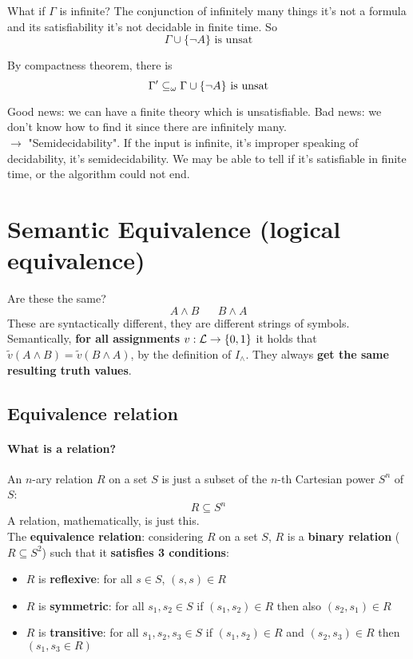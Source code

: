 	What if $\Gamma$ is infinite? The conjunction of infinitely many things it's not a formula and its satisfiability it's not decidable in finite time. So
	$$ \Gamma  \cup \{\neg A\} \text{ is unsat}$$

	By compactness theorem, there is
	$$ \Gamma' \subseteq_\omega \Gamma \cup \{\neg A\} \text{ is unsat} $$

	Good news: we can have a finite theory which is unsatisfiable. Bad news: we don't know how to find it since there are infinitely many.\\
	$\rightarrow$ "Semidecidability". If the input is infinite, it's improper speaking of decidability, it's semidecidability. We may be able to tell if it's satisfiable in finite time, or the algorithm could not end.\\

	\newpage

	\section{Semantic Equivalence (logical equivalence)}

	Are these the same?
	$$ A \wedge B \;\;\;\;\;\; B \wedge A $$
	These are syntactically different, they are different strings of symbols.\\

	Semantically, \textbf{for all assignments} $v: \mathcal{L} \rightarrow \{0,1\}$ it holds that $\tilde{v} (A \wedge B) = \tilde{v} (B \wedge A)$, by the definition of $I_\wedge$. They always \textbf{get the same resulting truth values}.\\

	\subsection{Equivalence relation}

	\paragraph{What is a relation?} An $n$-ary relation $R$ on a set $S$ is just a subset of the $n$-th Cartesian power $S^n$ of $S$:
	$$ R \subseteq S^n$$
	A relation, mathematically, is just this.\\

	The \textbf{equivalence relation}: considering $R$ on a set $S$, $R$ is a \textbf{binary relation} ($R \subseteq S^2$) such that it \textbf{satisfies 3 conditions}:
	\begin{itemize}
		\item $R$ is \textbf{reflexive}: for all $s \in S$, $(s,s) \in R$
		\item $R$ is \textbf{symmetric}: for all $s_1, s_2 \in S$ if $(s_1, s_2) \in R$ then also $(s_2, s_1) \in R$
		\item $R$ is \textbf{transitive}: for all $s_1, s_2, s_3 \in S$ if $(s_1, s_2) \in R$ and $(s_2, s_3) \in R$ then $(s_1, s_3 \in R)$
	\end{itemize}

